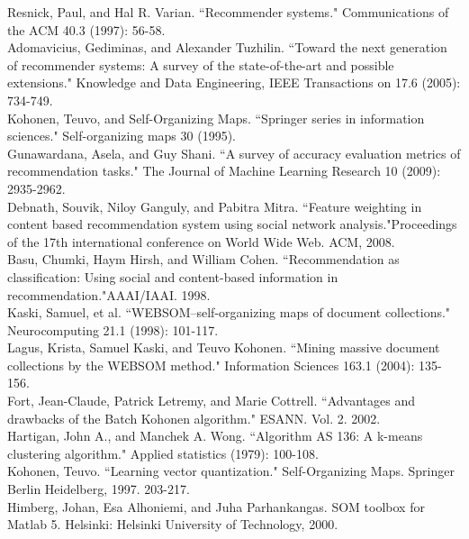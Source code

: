 \documentclass[conference]{IEEEtran}
\begin{document}
\begin{thebibliography}{1}

Resnick, Paul, and Hal R. Varian. ``Recommender systems." Communications of the ACM 40.3 (1997): 56-58.
\\
Adomavicius, Gediminas, and Alexander Tuzhilin. ``Toward the next generation of recommender systems: A survey of the state-of-the-art and possible extensions." Knowledge and Data Engineering, IEEE Transactions on 17.6 (2005): 734-749.
\\
Kohonen, Teuvo, and Self-Organizing Maps. ``Springer series in information sciences." Self-organizing maps 30 (1995).
\\
Gunawardana, Asela, and Guy Shani. ``A survey of accuracy evaluation metrics of recommendation tasks." The Journal of Machine Learning Research 10 (2009): 2935-2962.
\\
Debnath, Souvik, Niloy Ganguly, and Pabitra Mitra. ``Feature weighting in content based recommendation system using social network analysis."Proceedings of the 17th international conference on World Wide Web. ACM, 2008.
\\
Basu, Chumki, Haym Hirsh, and William Cohen. ``Recommendation as classification: Using social and content-based information in recommendation."AAAI/IAAI. 1998.
\\
Kaski, Samuel, et al. ``WEBSOM–self-organizing maps of document collections." Neurocomputing 21.1 (1998): 101-117.
\\
Lagus, Krista, Samuel Kaski, and Teuvo Kohonen. ``Mining massive document collections by the WEBSOM method." Information Sciences 163.1 (2004): 135-156.
\\
Fort, Jean-Claude, Patrick Letremy, and Marie Cottrell. ``Advantages and drawbacks of the Batch Kohonen algorithm." ESANN. Vol. 2. 2002.
\\
Hartigan, John A., and Manchek A. Wong. ``Algorithm AS 136: A k-means clustering algorithm." Applied statistics (1979): 100-108.
\\
Kohonen, Teuvo. ``Learning vector quantization." Self-Organizing Maps. Springer Berlin Heidelberg, 1997. 203-217.
\\
Himberg, Johan, Esa Alhoniemi, and Juha Parhankangas. SOM toolbox for Matlab 5. Helsinki: Helsinki University of Technology, 2000.
\\

\end{thebibliography}




\end{document}
